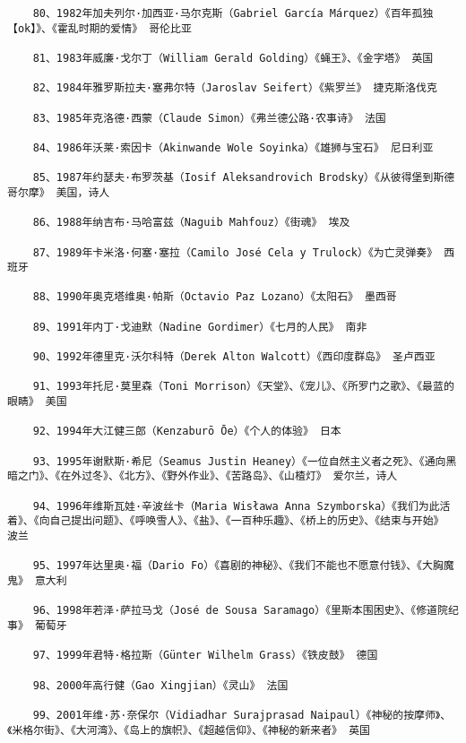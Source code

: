 \documentclass[UTF8]{../RepresentationUniverse}
\begin{document}
\begin{lstlisting}
    80、1982年加夫列尔·加西亚·马尔克斯（Gabriel García Márquez）《百年孤独【ok】》、《霍乱时期的爱情》 哥伦比亚
    
    81、1983年威廉·戈尔丁（William Gerald Golding）《蝇王》、《金字塔》 英国
    
    82、1984年雅罗斯拉夫·塞弗尔特（Jaroslav Seifert）《紫罗兰》 捷克斯洛伐克
    
    83、1985年克洛德·西蒙（Claude Simon）《弗兰德公路·农事诗》 法国
    
    84、1986年沃莱·索因卡（Akinwande Wole Soyinka）《雄狮与宝石》 尼日利亚
    
    85、1987年约瑟夫·布罗茨基（Iosif Aleksandrovich Brodsky）《从彼得堡到斯德哥尔摩》 美国，诗人
    
    86、1988年纳吉布·马哈富兹（Naguib Mahfouz）《街魂》 埃及
    
    87、1989年卡米洛·何塞·塞拉（Camilo José Cela y Trulock）《为亡灵弹奏》 西班牙
    
    88、1990年奥克塔维奥·帕斯（Octavio Paz Lozano）《太阳石》 墨西哥
    
    89、1991年内丁·戈迪默（Nadine Gordimer）《七月的人民》 南非
    
    90、1992年德里克·沃尔科特（Derek Alton Walcott）《西印度群岛》 圣卢西亚
    
    91、1993年托尼·莫里森（Toni Morrison）《天堂》、《宠儿》、《所罗门之歌》、《最蓝的眼睛》 美国
    
    92、1994年大江健三郎（Kenzaburō Ōe）《个人的体验》 日本
    
    93、1995年谢默斯·希尼（Seamus Justin Heaney）《一位自然主义者之死》、《通向黑暗之门》、《在外过冬》、《北方》、《野外作业》、《苦路岛》、《山楂灯》 爱尔兰，诗人
    
    94、1996年维斯瓦娃·辛波丝卡（Maria Wisława Anna Szymborska）《我们为此活着》、《向自己提出问题》、《呼唤雪人》、《盐》、《一百种乐趣》、《桥上的历史》、《结束与开始》 波兰
    
    95、1997年达里奥·福（Dario Fo）《喜剧的神秘》、《我们不能也不愿意付钱》、《大胸魔鬼》 意大利
    
    96、1998年若泽·萨拉马戈（José de Sousa Saramago）《里斯本围困史》、《修道院纪事》 葡萄牙
    
    97、1999年君特·格拉斯（Günter Wilhelm Grass）《铁皮鼓》 德国
    
    98、2000年高行健（Gao Xingjian）《灵山》 法国
    
    99、2001年维·苏·奈保尔（Vidiadhar Surajprasad Naipaul）《神秘的按摩师》、《米格尔街》、《大河湾》、《岛上的旗帜》、《超越信仰》、《神秘的新来者》 英国
    

\end{lstlisting}
\end{document}
